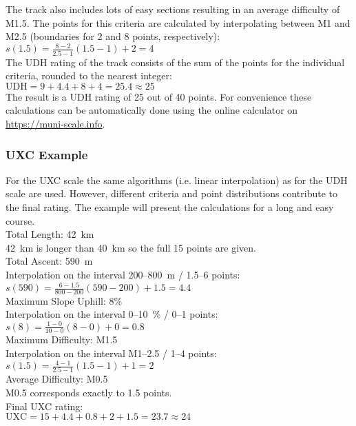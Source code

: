 \documentclass[a4paper,oneside]{scrartcl}
\begin{document}
The track also includes lots of easy sections resulting in an average difficulty
of M1.5. The points for this criteria are calculated by interpolating between M1 and M2.5
(boundaries for 2 and 8 points, respectively): 
$s(1.5) = \frac{8 - 2}{2.5 - 1} (1.5 - 1) + 2 = 4$\\

The UDH rating of the track consists of the sum of the points for the individual criteria, 
rounded to the nearest integer:\\
$\mathrm{UDH} = 9 + 4.4 + 8 + 4 = 25.4 \approx 25$\\
The result is a UDH rating of 25 out of 40 points. For convenience these calculations 
can be automatically done using the online calculator on \url{https://muni-scale.info}.

\subsubsection{UXC Example}
For the UXC scale the same algorithms (i.e. linear interpolation) as for the UDH scale are used. However, different criteria and point distributions contribute
to the final rating. The example will present the calculations for a long and easy course.\\

{\parindent0pt
Total Length: 42~km\\
42~km is longer than 40~km so the full 15 points are given. \\

Total Ascent: 590~m\\
Interpolation on the interval 200--800~m / 1.5--6 points:\\
$s(590) = \frac{6 - 1.5}{800 - 200} (590 - 200) + 1.5 = 4.4$\\

Maximum Slope Uphill:  8\% \\
Interpolation on the interval 0--10~\% / 0--1 points:\\
$s(8) = \frac{1 - 0}{10 - 0} (8 - 0) + 0 = 0.8$\\

Maximum Difficulty: M1.5\\
Interpolation on the interval M1--2.5 / 1--4 points:\\
$s(1.5) = \frac{4 - 1}{2.5 - 1} (1.5 - 1) + 1 = 2$\\

Average Difficulty: M0.5\\
M0.5 corresponds exactly to 1.5 points.\\

Final UXC rating:\\
$\mathrm{UXC} = 15 + 4.4 + 0.8 + 2 + 1.5 = 23.7 \approx 24$\\
}
\end{document}

